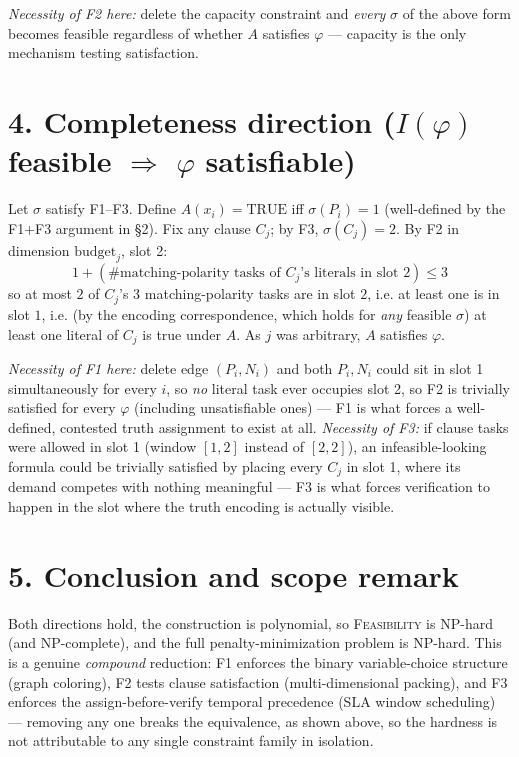 \documentclass[11pt]{article}
\begin{document}
\emph{Necessity of F2 here:} delete the capacity constraint and \emph{every} $\sigma$ of the
above form becomes feasible regardless of whether $A$ satisfies $\varphi$ — capacity is the
only mechanism testing satisfaction.

\section*{4. Completeness direction ($I(\varphi)$ feasible $\Rightarrow$ $\varphi$ satisfiable)}
Let $\sigma$ satisfy F1--F3. Define $A(x_i)=\mathrm{TRUE}$ iff $\sigma(P_i)=1$ (well-defined
by the F1+F3 argument in \S2). Fix any clause $C_j$; by F3, $\sigma(C_j)=2$. By F2 in
dimension $\mathrm{budget}_j$, slot 2:
$$ 1 + (\#\text{matching-polarity tasks of }C_j\text{'s literals in slot 2}) \le 3 $$
so at most $2$ of $C_j$'s $3$ matching-polarity tasks are in slot $2$, i.e. at least one is
in slot $1$, i.e. (by the encoding correspondence, which holds for \emph{any} feasible
$\sigma$) at least one literal of $C_j$ is true under $A$. As $j$ was arbitrary, $A$
satisfies $\varphi$.

\emph{Necessity of F1 here:} delete edge $(P_i,N_i)$ and both $P_i,N_i$ could sit in slot 1
simultaneously for every $i$, so \emph{no} literal task ever occupies slot 2, so F2 is
trivially satisfied for every $\varphi$ (including unsatisfiable ones) — F1 is what forces a
well-defined, contested truth assignment to exist at all. \emph{Necessity of F3:} if clause
tasks were allowed in slot 1 (window $[1,2]$ instead of $[2,2]$), an infeasible-looking
formula could be trivially satisfied by placing every $C_j$ in slot 1, where its demand
competes with nothing meaningful — F3 is what forces verification to happen in the slot
where the truth encoding is actually visible.

\section*{5. Conclusion and scope remark}
Both directions hold, the construction is polynomial, so \textsc{Feasibility} is NP-hard
(and NP-complete), and the full penalty-minimization problem is NP-hard. This is a genuine
\emph{compound} reduction: F1 enforces the binary variable-choice structure (graph
coloring), F2 tests clause satisfaction (multi-dimensional packing), and F3 enforces the
assign-before-verify temporal precedence (SLA window scheduling) — removing any one breaks
the equivalence, as shown above, so the hardness is not attributable to any single
constraint family in isolation.
\end{document}

